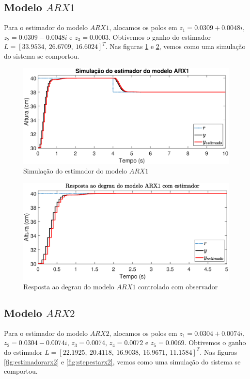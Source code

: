 \subsection{Modelo $ARX1$}\label{s:estarx1}
Para o estimador do modelo $ARX1$, alocamos os polos em $z_1=0.0309 + 0.0048i$, $z_2=0.0309 - 0.0048i$ e $z_3=0.0003$. Obtivemos o ganho do estimador $L=[33.9534,~26.6709,~16.6024]^T$. Nas figuras \ref{fig:estimadorarx1} e \ref{fig:stepestarx1}, vemos como uma simulação do sistema se comportou.

\begin{figure}[H]
	\centering
	\includegraphics[width=1\linewidth]{estimadorarx1}
	\caption[Simulação do estimador do modelo $ARX1$]{Simulação do estimador do modelo $ARX1$}
	\label{fig:estimadorarx1}
\end{figure}

\begin{figure}[H]
	\centering
	\includegraphics[width=1\linewidth]{stepestarx1}
	\caption[Resposta ao degrau do modelo $ARX1$ controlado com observador]{Resposta ao degrau do modelo $ARX1$ controlado com observador}
	\label{fig:stepestarx1}
\end{figure}

\subsection{Modelo $ARX2$}\label{s:estarx2}
Para o estimador do modelo $ARX2$, alocamos os polos em $z_1=0.0304 + 0.0074i$, $z_2=0.0304 - 0.0074i$, $z_3=0.0074$, $z_4=0.0072$ e $z_5=0.0069$. Obtivemos o ganho do estimador $L=[22.1925,~20.4118,~ 16.9038,~16.9671,~11.1584]^T$. Nas figuras \ref{fig:estimadorarx2} e \ref{fig:stepestarx2}, vemos como uma simulação do sistema se comportou.

